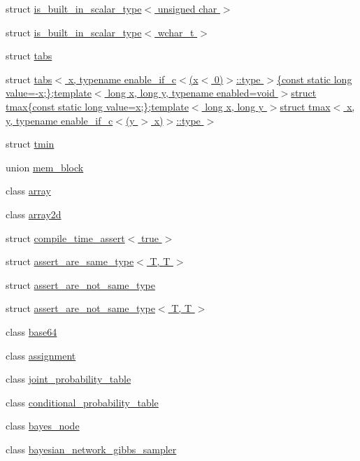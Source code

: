 \begin{DoxyCompactItemize}
struct \hyperlink{structdlib_1_1is__built__in__scalar__type_3_01unsigned_01char_01_4}{is\_\-built\_\-in\_\-scalar\_\-type$<$ unsigned char $>$}
\item 
struct \hyperlink{structdlib_1_1is__built__in__scalar__type_3_01wchar__t_01_4}{is\_\-built\_\-in\_\-scalar\_\-type$<$ wchar\_\-t $>$}
\item 
struct \hyperlink{structdlib_1_1tabs}{tabs}
\item 
struct \hyperlink{structdlib_1_1tabs_3_01x_00_01typename_01enable__if__c_3_07x_3_010_08_4_1_1type_01_4_02const_01s5583e8a7aa9817e380d6b80c74f287b0}{tabs$<$ x, typename enable\_\-if\_\-c$<$(x$<$ 0)$>$::type $>$\{const static long value=-\/x;\};template$<$ long x, long y, typename enabled=void $>$struct tmax\{const static long value=x;\};template$<$ long x, long y $>$struct tmax$<$ x, y, typename enable\_\-if\_\-c$<$(y $>$ x)$>$::type $>$}
\item 
struct \hyperlink{structdlib_1_1tmin}{tmin}
\item 
union \hyperlink{uniondlib_1_1mem__block}{mem\_\-block}
\item 
class \hyperlink{classdlib_1_1array}{array}
\item 
class \hyperlink{classdlib_1_1array2d}{array2d}
\item 
struct \hyperlink{structdlib_1_1compile__time__assert_3_01true_01_4}{compile\_\-time\_\-assert$<$ true $>$}
\item 
struct \hyperlink{structdlib_1_1assert__are__same__type_3_01T_00_01T_01_4}{assert\_\-are\_\-same\_\-type$<$ T, T $>$}
\item 
struct \hyperlink{structdlib_1_1assert__are__not__same__type}{assert\_\-are\_\-not\_\-same\_\-type}
\item 
struct \hyperlink{structdlib_1_1assert__are__not__same__type_3_01T_00_01T_01_4}{assert\_\-are\_\-not\_\-same\_\-type$<$ T, T $>$}
\item 
class \hyperlink{classdlib_1_1base64}{base64}
\item 
class \hyperlink{classdlib_1_1assignment}{assignment}
\item 
class \hyperlink{classdlib_1_1joint__probability__table}{joint\_\-probability\_\-table}
\item 
class \hyperlink{classdlib_1_1conditional__probability__table}{conditional\_\-probability\_\-table}
\item 
class \hyperlink{classdlib_1_1bayes__node}{bayes\_\-node}
\item 
class \hyperlink{classdlib_1_1bayesian__network__gibbs__sampler}{bayesian\_\-network\_\-gibbs\_\-sampler}

\end{DoxyCompactItemize}
